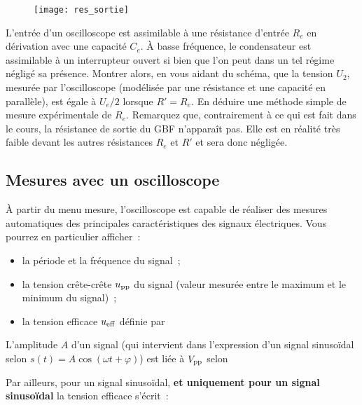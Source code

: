 \documentclass[../main/main.tex]{subfiles}
\begin{document}
\begin{wrapfigure}[10]{r}{0.4\textwidth}
	\vspace{-20pt}
	\begin{center}
		\texttt{[image: res\_sortie]}
	\end{center}
	\vspace{-30pt}
\end{wrapfigure}

L'entrée d'un oscilloscope est assimilable à une résistance d'entrée $R_{e}$ en
dérivation avec une capacité $C_{e}$. À basse fréquence, le condensateur est
assimilable à un interrupteur ouvert si bien que l'on peut dans un tel régime
négligé sa présence. Montrer alors, en vous aidant du schéma, que la tension
$U_2$, mesurée par l'oscilloscope (modélisée par une résistance et une capacité
en parallèle), est égale à $U_{e}/2$ lorsque $R' = R_{e}$. En déduire une
méthode simple de mesure expérimentale de $R_{e}$. Remarquez que, contrairement
à ce qui est fait dans le cours, la résistance de sortie du GBF n'apparaît pas.
Elle est en réalité très faible devant les autres résistances $R_{e}$ et $R'$ et
sera donc négligée.

\subsection{Mesures avec un oscilloscope}

À partir du menu mesure, l'oscilloscope est capable de réaliser des mesures
automatiques des principales caractéristiques des signaux électriques. Vous
pourrez en particulier afficher~:

\begin{itemize}
	\item la période et la fréquence du signal~;
	\item la tension crête-crête $u_{\rm pp}$ du signal (valeur mesurée entre le
	      maximum et le minimum du signal)~;
	\item la tension efficace $u_{\rm eff}$ définie par
\end{itemize}

\begin{minipage}{0.45\linewidth}
	L'amplitude $A$ d'un signal (qui intervient dans l'expression d'un signal
	sinusoïdal selon $s(t) = A \cos(\omega t + \varphi)$) est liée à $V_{\rm
				pp}$ selon

\end{minipage}
\hfill
\begin{minipage}{0.45\linewidth}
	Par ailleurs, pour un signal sinusoïdal, \textbf{et uniquement pour un
		signal sinusoïdal} la tension efficace s'écrit~:

\end{minipage}
\end{document}
